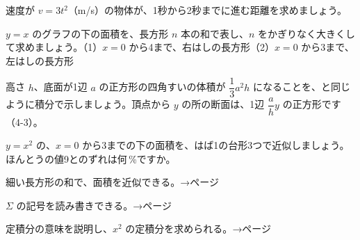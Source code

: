 \bkproblem 速度が $v=3t^2$（m/s）の物体が、1秒から2秒までに進む距離を求めましょう。


\bkproblem $y=x$ のグラフの下の面積を、長方形 $n$ 本の和で表し、$n$ をかぎりなく大きくして求めましょう。\quad（1）\nobreak $x=0$ から4まで、右はしの長方形\quad（2）\nobreak $x=0$ から3まで、左はしの長方形

\bkproblem 高さ $h$、底面が1辺 $a$ の正方形の四角すいの体積が $\dfrac{1}{3}a^2h$ になることを、と同じように積分で示しましょう。頂点から $y$ の所の断面は、1辺 $\dfrac{a}{h}y$ の正方形です（4-3）。

\bkproblem $y=x^2$ の、$x=0$ から3までの下の面積を、はば1の台形3つで近似しましょう。ほんとうの値9とのずれは何\,\%ですか。

\begin{furikaeri}
\begin{checklist}
\item 細い長方形の和で、面積を近似できる。\hfill{\footnotesize\sffamily\color{bkTheme}→\pageref{bk:5-10:hasami}ページ}
\item $\Sigma$ の記号を読み書きできる。\hfill{\footnotesize\sffamily\color{bkTheme}→\pageref{bk:5-10:sigma}ページ}
\item 定積分の意味を説明し、$x^2$ の定積分を求められる。\hfill{\footnotesize\sffamily\color{bkTheme}→\pageref{bk:5-10:teisekibun}ページ}
\end{checklist}
\end{furikaeri}

